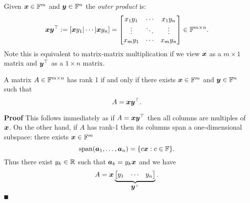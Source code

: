 \begin{definition} Given $\bm{{\mbox{\boldmath$x$\unboldmath}}} \in {\mathbb F}^m$ and $\bm{{\mbox{\boldmath$y$\unboldmath}}} \in {\mathbb F}^n$ the \emph{outer product} is:
\[
\ensuremath{\bm{\x}} \ensuremath{\bm{\y}}^\ensuremath{\top} := [\ensuremath{\bm{\x}} y_1 | \ensuremath{\cdots} | \ensuremath{\bm{\x}} y_n] = \begin{bmatrix} x_1 y_1 & \ensuremath{\cdots} & x_1 y_n \\
                        \ensuremath{\vdots} & \ensuremath{\ddots} & \ensuremath{\vdots} \\
                        x_m y_1 & \ensuremath{\cdots} & x_m y_n \end{bmatrix} \ensuremath{\in} \ensuremath{\bbF}^{m \ensuremath{\times} n}.
\]
Note this is equivalent to matrix-matrix multiplication if we view $\bm{{\mbox{\boldmath$x$\unboldmath}}}$ as a $m \ensuremath{\times} 1$ matrix and $\bm{{\mbox{\boldmath$y$\unboldmath}}}^\top$ as a $1 \ensuremath{\times} n$ matrix. \end{definition}

\begin{proposition}[rank-1] A matrix $A \in {\mathbb F}^{m\times n}$ has rank 1 if and only if there exists $\bm{{\mbox{\boldmath$x$\unboldmath}}} \in {\mathbb F}^m$ and $\bm{{\mbox{\boldmath$y$\unboldmath}}} \in {\mathbb F}^n$ such that
\[
A = \bm{{\mbox{\boldmath$x$\unboldmath}}} \bm{{\mbox{\boldmath$y$\unboldmath}}}^\top.
\]
\end{proposition}
\textbf{Proof} This follows immediately as if $A = \bm{{\mbox{\boldmath$x$\unboldmath}}} \bm{{\mbox{\boldmath$y$\unboldmath}}}^\top$ then all columns are multiples of $\bm{{\mbox{\boldmath$x$\unboldmath}}}$. On the other hand, if $A$ has rank-1 then its columns span a one-dimensional subspace: there exists $\bm{{\mbox{\boldmath$x$\unboldmath}}} \in {\mathbb F}^m$
\[
{\rm span}(\bm{{\mbox{\boldmath$a$\unboldmath}}}_1, \ldots, \bm{{\mbox{\boldmath$a$\unboldmath}}}_n) = \{ c \bm{{\mbox{\boldmath$x$\unboldmath}}} : c \in {\mathbb F} \}.
\]
Thus there exist $y_k \in {\mathbb R}$ such that $\bm{{\mbox{\boldmath$a$\unboldmath}}}_k = y_k \bm{{\mbox{\boldmath$x$\unboldmath}}}$ and we have
\[
A = \ensuremath{\bm{\x}} \underbrace{\begin{bmatrix} y_1 & \ensuremath{\cdots} & y_n \end{bmatrix}}_{\ensuremath{\bm{\y}}^\ensuremath{\top}}.
\]
\ensuremath{\QED}

